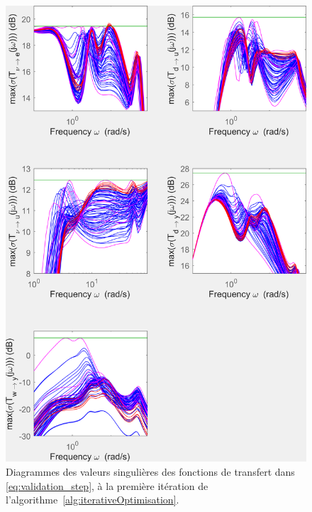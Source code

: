 \begin{figure}[ht!]
    \centering
    \includegraphics[trim=0cm 0cm 0cm 0cm,clip,width=0.6\columnwidth]{figures/transferts_tcst.png}
    \caption{Diagrammes des valeurs singulières des fonctions de transfert dans \eqref{eq:validation_step}, à la première itération de l'algorithme~\ref{alg:iterativeOptimisation}.}
    \label{fig:transferts_tcst}
\end{figure}
 

